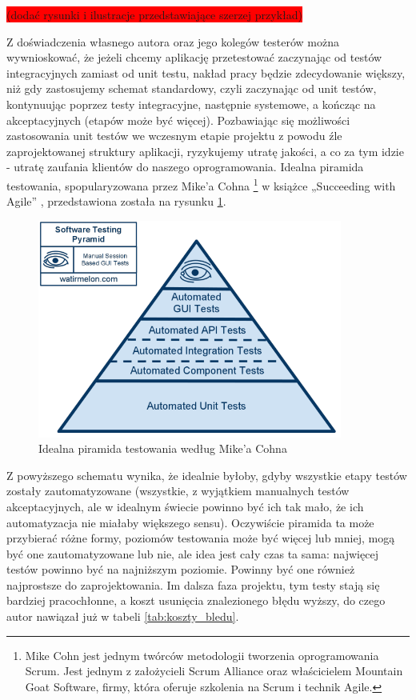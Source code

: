 \colorbox{red}{(dodać rysunki i ilustracje przedstawiające szerzej przykład)}

\newpage
Z doświadczenia własnego autora oraz jego kolegów testerów można wywnioskować, że jeżeli chcemy aplikację przetestować zaczynając od testów integracyjnych zamiast od unit testu, nakład pracy będzie zdecydowanie większy, niż gdy zastosujemy schemat standardowy, czyli zaczynając od unit testów, kontynuując poprzez testy integracyjne, następnie systemowe, a kończąc na akceptacyjnych (etapów może być więcej). Pozbawiając się możliwości zastosowania unit testów we wczesnym etapie projektu z powodu źle zaprojektowanej struktury aplikacji, ryzykujemy utratę jakości, a co za tym idzie - utratę zaufania klientów do naszego oprogramowania. Idealna piramida testowania, spopularyzowana przez Mike’a Cohna \footnote{Mike Cohn jest jednym twórców metodologii tworzenia oprogramowania Scrum. Jest jednym z założycieli Scrum Alliance oraz właścicielem Mountain Goat Software, firmy, która oferuje szkolenia na Scrum i technik Agile.}  w książce „Succeeding with Agile” \cite{bib:cohn:agile}, przedstawiona została na rysunku \ref{fig:idealna_piramida}.

\begin{figure}[!htb]
    \centering
    \includegraphics[width=10cm]{imgs/ch3_idealna_piramida.png}
    \caption
{Idealna piramida testowania według Mike'a Cohna\cite{bib:cohn:agile}}
    \label{fig:idealna_piramida}
\end{figure} 

Z powyższego schematu wynika, że idealnie byłoby, gdyby wszystkie etapy testów zostały zautomatyzowane (wszystkie, z wyjątkiem manualnych testów akceptacyjnych, ale w idealnym świecie powinno być ich tak mało, że ich automatyzacja nie miałaby większego sensu). Oczywiście piramida ta może przybierać różne formy, poziomów testowania może być więcej lub mniej, mogą być one zautomatyzowane lub nie, ale idea jest cały czas ta sama: najwięcej testów powinno być na najniższym poziomie. Powinny być one również najprostsze do zaprojektowania. Im dalsza faza projektu, tym testy stają się bardziej pracochłonne, a koszt usunięcia znalezionego błędu wyższy, do czego autor nawiązał już w tabeli \ref{tab:koszty_bledu}.

